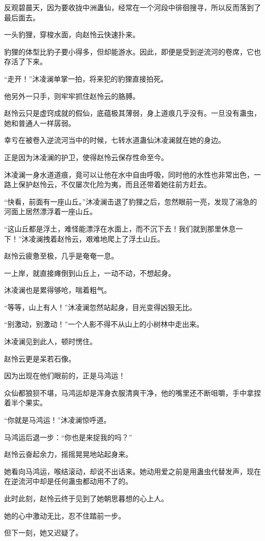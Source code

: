 \begin{this_body}
反观碧晨天，因为要收拢中洲蛊仙，经常在一个河段中徘徊搜寻，所以反而落到了最后面去。

一头豹狸，穿梭水面，向赵怜云快速扑来。

豹狸的体型比豹子要小得多，但却能游水。因此，即便是受到逆流河的卷席，它也存活了下来。

“走开！”沐凌澜单掌一拍，将来犯的豹狸直接拍死。

他另外一只手，则牢牢抓住赵怜云的胳膊。

赵怜云只是虚窍成就的假仙，底蕴极其薄弱，身上道痕几乎没有。一旦没有蛊虫，她和普通人一样孱弱。

幸亏在被卷入逆流河当中的时候，七转水道蛊仙沐凌澜就在她的身边。

正是因为沐凌澜的护卫，使得赵怜云保存性命至今。

沐凌澜一身水道道痕，竟可以让他在水中自由呼吸，同时他的水性也非常出色，一路上保护赵怜云，不仅屡次化险为夷，而且还带着她往前方赶去。

“快看，前面有一座山丘。”沐凌澜击退了豹狸之后，忽然眼前一亮，发现了湍急的河面上居然漂浮着一座山丘。

“这山丘都是浮土，难怪能漂浮在水面上，而不沉下去！我们就到那里休息一下！”沐凌澜拽着赵怜云，艰难地爬上了浮土山丘。

赵怜云疲惫至极，几乎是奄奄一息。

一上岸，就直接瘫倒到山丘上，一动不动，不想起身。

沐凌澜也是累得够呛，喘着粗气。

“等等，山上有人！”沐凌澜忽然站起身，目光变得凶狠无比。

“别激动，别激动！”一个人影不得不从山上的小树林中走出来。

沐凌澜见到此人，顿时愣住。

赵怜云更是呆若石像。

因为出现在他们眼前的，正是马鸿运！

众仙都狼狈不堪，马鸿运却是浑身衣服清爽干净，他的嘴里还不断咀嚼，手中拿捏着半个果实。

“你就是马鸿运！”沐凌澜惊呼道。

马鸿运后退一步：“你也是来捉我的吗？”

赵怜云奋起余力，摇摇晃晃地站起身来。

她看向马鸿运，喉结滚动，却说不出话来。她动用爱之前是用蛊虫代替发声，现在在逆流河中却是任何蛊虫都动用不了的。

此时此刻，赵怜云终于见到了她朝思暮想的心上人。

她的心中激动无比，忍不住踏前一步。

但下一刻，她又迟疑了。


\end{this_body}
